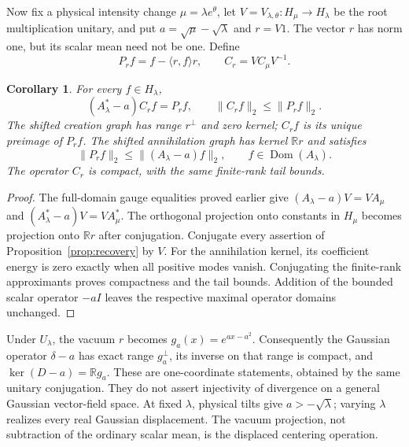 \documentclass[11pt]{article}
\newtheorem{corollary}[theorem]{Corollary}
\newcommand{\R}{\mathbb R}\newcommand{\N}{\mathbb N}
\newcommand{\Dom}{\operatorname{Dom}}
\begin{document}
Now fix a physical intensity change $\mu=\lambda e^\theta$, let
$V=V_{\lambda,\theta}:H_\mu\to H_\lambda$ be the root multiplication
unitary, and put $a=\sqrt\mu-\sqrt\lambda$ and $r=V1$.
The vector $r$ has norm one, but its scalar mean need not be one.
Define
\[
 P_rf=f-\langle r,f\rangle r,\qquad C_r=VC_\mu V^{-1}.
\]
\begin{corollary}\label{cor:coherent-recovery}
For every $f\in H_\lambda$,
\[
 (A_\lambda^*-a)C_rf=P_rf,\qquad
 \|C_rf\|_2\leq\|P_rf\|_2.
\]
The shifted creation graph has range $r^\perp$ and zero kernel;
$C_rf$ is its unique preimage of $P_rf$. The shifted annihilation
graph has kernel $\R r$ and satisfies
\[
 \|P_rf\|_2\leq\|(A_\lambda-a)f\|_2,
 \qquad f\in\Dom(A_\lambda).
\]
The operator $C_r$ is compact, with the same finite-rank tail bounds.
\end{corollary}
\begin{proof}
The full-domain gauge equalities proved earlier give
$(A_\lambda-a)V=VA_\mu$ and
$(A_\lambda^*-a)V=VA_\mu^*$.
The orthogonal projection onto constants in $H_\mu$ becomes projection
onto $\R r$ after conjugation. Conjugate every assertion of
Proposition~\ref{prop:recovery} by $V$. For the annihilation kernel,
its coefficient energy is zero exactly when all positive modes vanish.
Conjugating the finite-rank approximants proves compactness and the
tail bounds. Addition of the bounded scalar operator $-aI$ leaves the
respective maximal operator domains unchanged.
\end{proof}

Under $U_\lambda$, the vacuum $r$ becomes $g_a(x)=e^{ax-a^2}$.
Consequently the Gaussian operator $\delta-a$ has exact range
$g_a^\perp$, its inverse on that range is compact, and
$\ker(D-a)=\R g_a$. These are one-coordinate statements, obtained
by the same unitary conjugation. They do not assert injectivity of
divergence on a general Gaussian vector-field space. At fixed
$\lambda$, physical tilts give $a>-\sqrt\lambda$; varying $\lambda$
realizes every real Gaussian displacement. The vacuum projection,
not subtraction of the ordinary scalar mean, is the displaced
centering operation.
\end{document}
